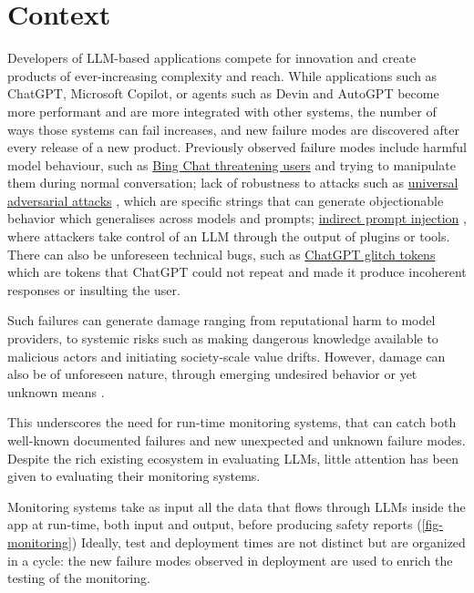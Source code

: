 \documentclass{article}
\begin{document}


\section{Context}


Developers of LLM-based applications compete for innovation and create
products of ever-increasing complexity and reach. While applications such as
ChatGPT, Microsoft Copilot, or agents such as Devin and AutoGPT
become more performant and are more
integrated with other systems, the number of ways those systems can fail
increases, and new failure modes are discovered after every release of a
new product. Previously observed failure modes include
harmful model behaviour, such as \href{https://www.theverge.com/2023/2/15/23599072/microsoft-ai-bing-personality-conversations-spy-employees-webcams}{Bing
Chat threatening users} \cite{bing-chat-verge-manipulative-liar} and trying to manipulate them during normal conversation;
lack of robustness to attacks such as
\href{https://arxiv.org/abs/2307.15043}{universal adversarial attacks} \cite{universal-tranferable-llm-attacks}, which are specific strings that can generate objectionable behavior which generalises across models and prompts;
\href{https://arxiv.org/abs/2302.12173}{indirect prompt injection} \cite{indirect-prompt-injections}, where attackers take control of an LLM through the output of plugins or tools.
There can also be unforeseen technical bugs, such as
\href{https://www.vice.com/en/article/epzyva/ai-chatgpt-tokens-words-break-reddit}{ChatGPT glitch tokens} \cite{solid-gold-magikarp-LW}
which are tokens that ChatGPT could not repeat and made it produce incoherent responses or insulting the user.


Such failures can generate damage ranging from reputational harm to model
providers, to systemic risks such as making dangerous knowledge available to
malicious actors and initiating society-scale value drifts. However, damage can
also be of unforeseen nature, through emerging undesired behavior or yet unknown
means \cite{overview-catastrophic-risks}.

This underscores the need for run-time monitoring systems, that can
catch both well-known documented failures and new unexpected and unknown
failure modes. Despite the rich existing ecosystem in evaluating LLMs,
little attention has been given to evaluating their monitoring systems.

Monitoring systems take as input all the data that flows through LLMs inside the
app at run-time, both input and output, before producing safety reports (\autoref{fig-monitoring})
Ideally, test and deployment times are not distinct but are organized in a
cycle: the new failure modes observed in deployment are used to enrich the
testing of the monitoring.
\end{document}
